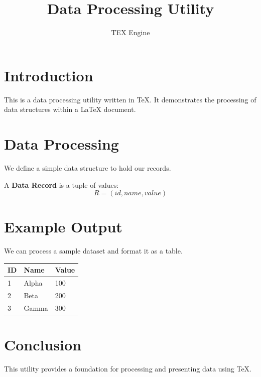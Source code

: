 \documentclass{article}
\begin{document}
\title{Data Processing Utility}
\author{TEX Engine}
\date{}\maketitle

\section{Introduction}
This is a data processing utility written in \TeX. It demonstrates the processing of data structures within a LaTeX document.

\section{Data Processing}
We define a simple data structure to hold our records.
\begin{definition}
    A \textbf{Data Record} is a tuple of values:
    \begin{equation}
        R = (id, name, value)
    \end{equation}
\end{definition}

\section{Example Output}
We can process a sample dataset and format it as a table.

\begin{tabular}{lll}
\toprule
\textbf{ID} & \textbf{Name} & \textbf{Value} \\
\midrule
1 & Alpha & 100 \\
2 & Beta & 200 \\
3 & Gamma & 300 \\
\bottomrule
\end{tabular}

\section{Conclusion}
This utility provides a foundation for processing and presenting data using \TeX.
\end{document}
